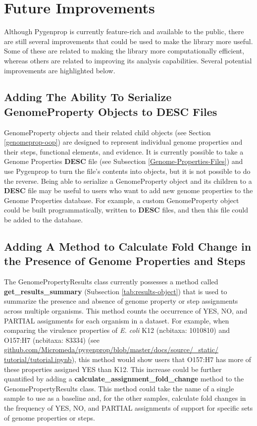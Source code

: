 \section{Future Improvements}

Although Pygenprop is currently feature-rich and available to the public, there 
are still several improvements that could be used to make the library more 
useful. Some of these are related to making the library more computationally 
efficient, whereas others are related to improving its analysis capabilities. 
Several potential improvements are highlighted below.

\subsection{Adding The Ability To Serialize GenomeProperty Objects to DESC 
Files}

GenomeProperty objects and their related child objects (see Section 
\ref{genomeprop-oop}) are designed to represent individual genome properties 
and their steps, functional elements, and evidence. It is currently possible to 
take a Genome Properties \textbf{DESC} file (see Subsection 
\ref{Genome-Properties-Files}) and use Pygenprop to turn the file's contents 
into objects, but it is not possible to do the reverse. Being able to serialize 
a GenomeProperty object and its children to a \textbf{DESC} file may be useful 
to users who want to add new genome properties to the Genome Properties 
database. For example, a custom GenomeProperty object could be built 
programmatically, written to \textbf{DESC} files, and then this file could be 
added to the database.

\subsection{Adding A Method to Calculate Fold Change in the Presence of Genome 
Properties and Steps}

The GenomePropertyResults class currently possesses a method called 
\textbf{get\_results\_summary} (Subsection \ref{tab:results-object}) that is 
used to summarize the presence and absence of genome property or step 
assignments across multiple organisms. This method counts the occurrence of YES, 
NO, and PARTIAL assignments for each organism in a dataset. For example, when 
comparing the virulence properties of \textit{E. coli} K12 (\gls{ncbitaxa}: 
1010810) and O157:H7 (\gls{ncbitaxa}: 83334) (see 
\href{http://github.com/Micromeda/pygenprop/blob/master/docs/source/_static/tutorial/tutorial.ipynb}{github.com/Micromeda/pygenprop/blob/master/docs/source/\_static/ 
tutorial/tutorial.ipynb}), this method would show users that O157:H7 has more of 
these properties assigned YES than K12. This increase could be further 
quantified by adding a \textbf{calculate\_assignment\_fold\_change} method to 
the GenomePropertyResults class. This method could take the name of a single 
sample to use as a baseline and, for the other samples, calculate fold changes 
in the frequency of YES, NO, and PARTIAL assignments of support for specific 
sets of genome properties or steps.

